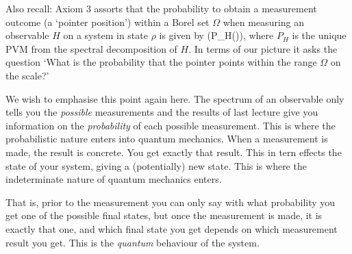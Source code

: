 Also recall: Axiom 3 assorts that the probability to obtain a measurement outcome (a `pointer position') within a Borel set $\Omega$ when measuring an observable $H$ on a system in state $\rho$ is given by
\bse 
\Tr\big(P_H(\Omega)\circ \rho\big),
\ese 
where $P_H$ is the unique PVM from the spectral decomposition of $H$. In terms of our picture it asks the question `What is the probability that the pointer points within the range $\Omega$ on the scale?'
\begin{center}
\end{center}

\br 
We wish to emphasise this point again here. The spectrum of an observable only tells you the \emph{possible} measurements and the results of last lecture give you information on the \emph{probability} of each possible measurement. This is where the probabilistic nature enters into quantum mechanics. When a measurement is made, the result is concrete. You get exactly that result. This in tern effects the state of your system, giving a (potentially) new state. This is where the indeterminate nature of quantum mechanics enters. 

That is, prior to the measurement you can only say with what probability you get one of the possible final states, but once the measurement is made, it is exactly that one, and which final state you get depends on which measurement result you get. This is the \emph{quantum} behaviour of the system. 

